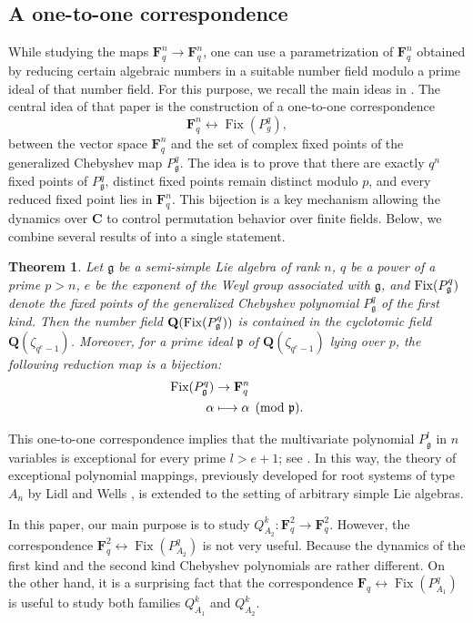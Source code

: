 \documentclass{amsart}
\newcommand{\mf}{\mathfrak}
\newcommand{\C}{\mathbf C}
\newcommand{\Q}{\mathbf Q}
\newcommand{\F}{\mathbf F}
\newcommand{\Fix}{\textnormal{Fix}}
\numberwithin{equation}{section}
\theoremstyle{plain}
\newtheorem{theorem}{Theorem}
\theoremstyle{definition}
\begin{document}
\subsection{A one-to-one correspondence}
While studying the maps $\F_q^n \rightarrow \F_q^n$, one can use a parametrization of $\F_q^n$ obtained by reducing certain algebraic numbers in a suitable number field modulo a prime ideal of that number field. For this purpose, we recall the main ideas in \cite{kuc10}. The central idea of that paper is the construction of a one-to-one correspondence
\[\F_q^n \leftrightarrow \operatorname{Fix}(P_g^q),\]
between the vector space $\F_q^n$ and the set of complex fixed points of the generalized Chebyshev map $P_\mf{g}^q$. The idea is to prove that there are exactly $q^n$ fixed points of $P_\mf{g}^q$, distinct fixed points remain distinct modulo $p$, and every reduced fixed point lies in $\F_q^n$. This bijection is a key mechanism allowing the dynamics over $\C$ to control permutation behavior over finite fields. Below, we combine several results of \cite{kuc10} into a single statement.
\begin{theorem}\label{thm:FixPtscorrespondence}
Let $\mf{g}$ be a semi-simple Lie algebra of rank $n$, $q$ be a power of a prime $p>n$, $e$ be the exponent of the Weyl group associated with $\mf{g}$, and $\Fix(P_{\mf{g}}^q)$ denote the fixed points of the generalized Chebyshev polynomial $P_{\mf{g}}^q$ of the first kind. Then the number field $\Q(\Fix(P_{\mf{g}}^q))$ is contained in the cyclotomic field $\Q(\zeta_{q^e-1})$. Moreover, for a prime ideal $\mf{p}$ of $\Q(\zeta_{q^e-1})$ lying over $p$, the following reduction map is a bijection:
\begin{align*}
	\Fix(P_{\mf{g}}^q)&\rightarrow \F_q^n\\
	\alpha&\longmapsto \alpha\pmod{\mf{p}}.
\end{align*}
\end{theorem}
This one-to-one correspondence implies that the multivariate polynomial $P_{\mathfrak g}^l$ in $n$ variables is exceptional for every prime $l>e+1$; see \cite[Corollary 4]{kuc10}. In this way, the theory of exceptional polynomial mappings, previously developed for root systems of type $A_n$ by Lidl and Wells \cite{lidlwells}, is extended to the setting of arbitrary simple Lie algebras.

In this paper, our main purpose is to study $Q_{A_2}^k: \F_q^2 \rightarrow \F_q^2$. However, the correspondence $\F_q^2 \leftrightarrow \operatorname{Fix}(P_{A_2}^q)$ is not very useful. Because the dynamics of the first kind and the second kind Chebyshev polynomials are rather different. On the other hand, it is a surprising fact that the correspondence 
$\F_q \leftrightarrow \operatorname{Fix}(P_{A_1}^q)$
is useful to study both families $Q_{A_1}^k$ and $Q_{A_2}^k$. 
\end{document}
